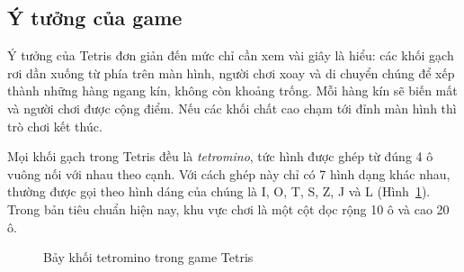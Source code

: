 \subsection{Ý tưởng của game}

Ý tưởng của Tetris đơn giản đến mức chỉ cần xem vài giây là hiểu: các khối gạch rơi dần xuống từ phía trên màn hình, người chơi xoay và di chuyển chúng để xếp thành những hàng ngang kín, không còn khoảng trống. Mỗi hàng kín sẽ biến mất và người chơi được cộng điểm. Nếu các khối chất cao chạm tới đỉnh màn hình thì trò chơi kết thúc.

Mọi khối gạch trong Tetris đều là \textit{tetromino}, tức hình được ghép từ đúng 4 ô vuông nối với nhau theo cạnh. Với cách ghép này chỉ có 7 hình dạng khác nhau, thường được gọi theo hình dáng của chúng là I, O, T, S, Z, J và L (Hình~\ref{fig:bay_tetromino}). Trong bản tiêu chuẩn hiện nay, khu vực chơi là một cột dọc rộng 10 ô và cao 20 ô.

\begin{figure}[H]
\centering
{}
\caption{Bảy khối tetromino trong game Tetris}\label{fig:bay_tetromino}
\end{figure}

